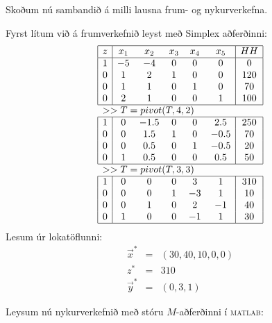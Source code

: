 \begin{samepage}
Skoðum nú sambandið á milli lausna frum- og nykurverkefna.
\begin{lausn}
Fyrst lítum við á frumverkefnið leyst með Simplex aðferðinni:
{\scriptsize
\[\begin{array}{|c|ccccc|c|}\hline
z & x_1 & x_2 & x_3 & x_4 & x_5 & HH\\ \hline 
     1 & -5 & -4 &  0 &  0 &  0 &  0 \\
     0 &  1 &  2 &  1 &  0 &  0 &  120 \\
     0 &  1 &  1 &  0 &  1 &  0 & 70 \\
     0 &  2 &  1 &  0 &  0 &  1 &  100 \\ \hline 
\multicolumn{7}{l}{>> T=pivot(T,4,2)} \\  \hline 
    1 & 0 &-1.5 & 0 & 0 & 2.5 &  250 \\
    0 & 0 & 1.5 & 1 & 0 &-0.5 &  70 \\
    0 & 0 & 0.5 & 0 & 1 &-0.5 &  20 \\
    0 & 1 & 0.5 & 0 & 0 & 0.5 &  50 \\ \hline 
\multicolumn{7}{l}{>> T=pivot(T,3,3)} \\ \hline 
     1  &   0  &   0  &   0  &   3 &    1 &  310 \\
     0  &   0  &   0  &   1  &  -3 &    1 &   10 \\
     0  &   0  &   1  &   0  &   2 &   -1 &   40 \\
     0  &   1  &   0  &   0  &  -1 &    1 &   30 \\ \hline
  \end{array}\]}
Lesum úr lokatöflunni:
\begin{eqnarray*}
 \vec{x}^* &=&  (30, 40, 10, 0, 0) \\ z^* &=& 310 \\ \vec{y}^* &=& (0, 3, 1)
\end{eqnarray*}
\end{lausn}
\end{samepage}
Leysum nú nykurverkefnið með stóru $M$-aðferðinni í \textsc{matlab}:
